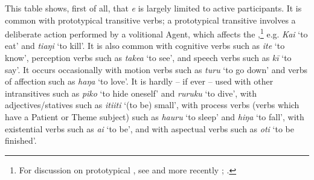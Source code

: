 \begin{table}
\caption{Verb classes and the use of \textit{e}}
\label{tab:59}
\end{table}

This table shows, first of all, that \textit{e} is largely limited to active participants. It is common with prototypical transitive verbs; a prototypical transitive involves a deliberate action performed by a volitional Agent, which affects the ,\footnote{\label{fn:395}For discussion on prototypical , see \citet{HopperThompson1980} and more recently \citet{Ball2007}; \citet{Naess2007}.} e.g. \textit{Kai} ‘to eat’ and \textit{tiaŋi} ‘to kill’. It is also common with cognitive verbs such as \textit{{\ꞌ}ite} ‘to know’, perception verbs such as \textit{take{\ꞌ}a} ‘to see’, and speech verbs such as \textit{kī} ‘to say’. It occurs occasionally with motion verbs such as \textit{turu} ‘to go down’ and verbs of affection such as \textit{haŋa} ‘to love’. It is hardly – if ever – used  with other  intransitives such as \textit{piko} ‘to hide oneself’ and \textit{ruruku} ‘to dive’, with adjectives/statives such as \textit{{\ꞌ}iti{\ꞌ}iti} ‘(to be) small’, with process verbs (verbs which have a Patient or Theme subject) such as \textit{ha{\ꞌ}uru} ‘to sleep’ and \textit{hiŋa} ‘to fall’, with existential verbs such as \textit{ai} ‘to be’, and with aspectual verbs such as \textit{oti} ‘to be finished’.


